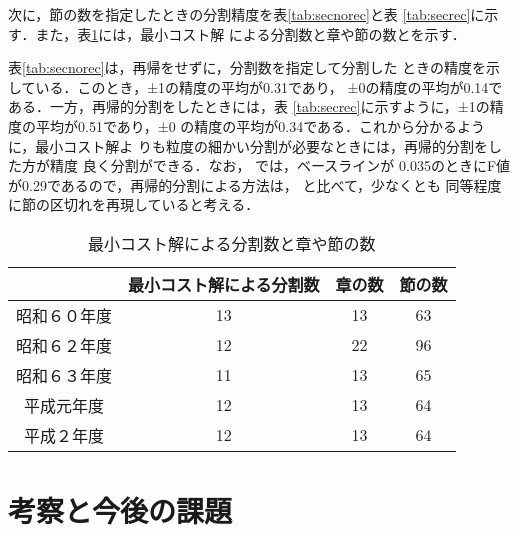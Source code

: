 次に，節の数を指定したときの分割精度を表\ref{tab:secnorec}と表
\ref{tab:secrec}に示す．また，表\ref{tab:num}には，最小コスト解
による分割数と章や節の数とを示す．

表\ref{tab:secnorec}は，再帰をせずに，分割数を指定して分割した
ときの精度を示している．このとき，±1の精度の平均が0.31であり，
±0の精度の平均が0.14である．一方，再帰的分割をしたときには，表
\ref{tab:secrec}に示すように，±1の精度の平均が0.51であり，±0
の精度の平均が0.34である．これから分かるように，最小コスト解よ
りも粒度の細かい分割が必要なときには，再帰的分割をした方が精度
良く分割ができる．なお，
\cite{nakao00:_algor_one_summar_long_text}では，ベースラインが
0.035のときにF値が0.29であるので，再帰的分割による方法は，
\cite{nakao00:_algor_one_summar_long_text}と比べて，少なくとも
同等程度に節の区切れを再現していると考える．

\begin{table}[htbp]
  \begin{center}
    \caption{最小コスト解による分割数と章や節の数}
    \begin{tabular}{|c|ccc|}\hline
                   & 最小コスト解による分割数 & 章の数 & 節の数  \\\hline
      昭和６０年度 & 13 & 13     & 63     \\
      昭和６２年度 & 12 & 22     & 96    \\
      昭和６３年度 & 11 & 13     & 65     \\ 
      平成元年度   & 12 & 13     & 64     \\
      平成２年度   & 12 & 13     & 64     \\\hline
    \end{tabular}
    \label{tab:num}
  \end{center}
\end{table}

\vspace*{20pt}

\section{考察と今後の課題}
\label{sec:discussion}

